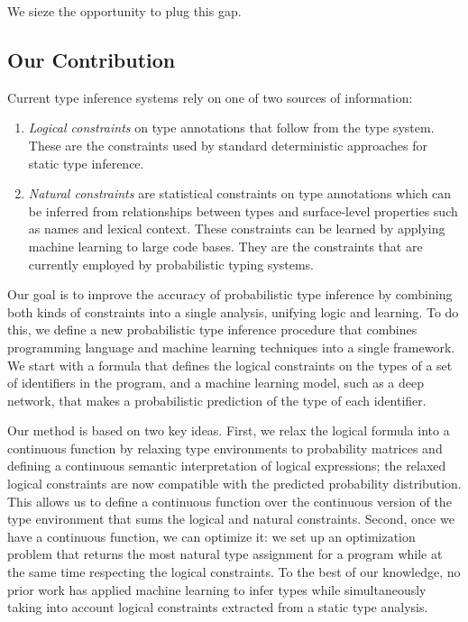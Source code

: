 \documentclass[sigplan,10pt,anonymous]{acmart} %
\theoremstyle{plain}
\theoremstyle{remark}
\theoremstyle{definition}
\begin{document}
We sieze the opportunity to plug this gap.

\subsection{Our Contribution}
Current type inference systems rely
on one of two sources of information:
\begin{enumerate}[label=(\Roman*)]
  \item \emph{Logical constraints} on type annotations that follow from the type system.
        These are the  constraints used by standard deterministic approaches for static type inference.
  \item \emph{Natural constraints} are statistical constraints on type annotations
        which can be inferred from relationships between types and surface-level properties such as names and lexical context.
        These constraints can be learned by applying machine learning to large code bases.
        They are the constraints that are currently employed by probabilistic typing systems.
\end{enumerate}
Our goal is to improve the accuracy of probabilistic type
inference by combining both kinds of constraints into a single analysis, unifying logic and learning.
To do this, we define a new probabilistic type inference procedure that combines
programming language and machine learning techniques into a single framework.
We start with a formula that defines the logical constraints on the types of a set of identifiers in the program,
and a machine learning model, such as a deep network, that makes a probabilistic prediction
of the type of each identifier.

Our method is based on two key ideas.
First, we relax the logical formula into a continuous function by relaxing type environments
to probability matrices and defining
a continuous semantic interpretation of logical expressions; the relaxed logical constraints
are now compatible with the predicted probability distribution.
This allows us to define a continuous function over the continuous version of the type environment
that sums the logical and natural constraints.
Second, once we have a continuous function, we can optimize it:
we set up an optimization problem that returns the most natural type assignment for a
program while at the same time respecting the logical constraints.
To the best of our knowledge, no prior work has applied machine learning to infer types
while simultaneously taking into account logical constraints extracted from a static type analysis.
\end{document}
